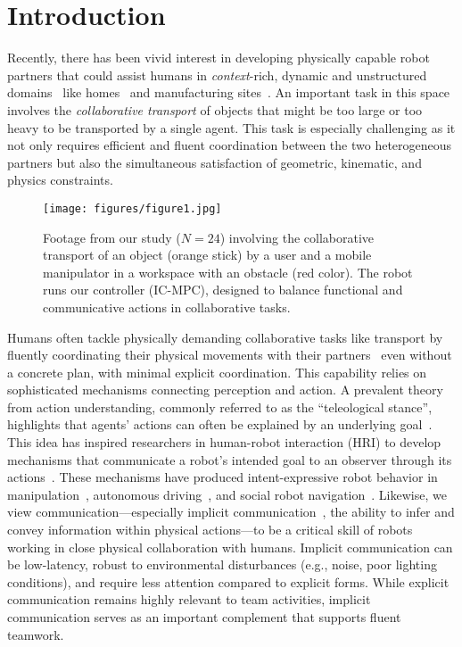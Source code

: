 \section{Introduction}\label{sec:introduction}

Recently, there has been vivid interest in developing physically capable robot partners that could assist humans in \emph{context}-rich, dynamic and unstructured domains~\citep{selvaggio2021survey} like homes~\citep{homerobotovmmchallenge2023, van2011robocup} and manufacturing sites~\citep{matheson2019human}. An important task in this space involves the \emph{collaborative transport} of objects that might be too large or too heavy to be transported by a single agent. This task is especially challenging as it not only requires efficient and fluent coordination between the two heterogeneous partners but also the simultaneous satisfaction of geometric, kinematic, and physics constraints.

\begin{figure}[t]
  \texttt{[image: figures/figure1.jpg]}
  \caption{Footage from our study ($N=24$) involving the collaborative transport of an object (orange stick) by a user and a mobile manipulator in a workspace with an obstacle (red color). The robot runs our controller (IC-MPC), designed to balance functional and communicative actions in collaborative tasks.}
  \label{fig:teaser}
\end{figure}

Humans often tackle physically demanding collaborative tasks like transport by fluently coordinating their physical movements with their partners~\citep{sebanz2006joint} even without a concrete plan, with minimal explicit coordination. This capability relies on sophisticated mechanisms connecting perception and action. A prevalent theory from action understanding, commonly referred to as the ``teleological stance'', highlights that agents' actions can often be explained by an underlying goal~\citep{csibra2007obsessed,gergely1995intentional,baker2009understanding}. This idea has inspired researchers in human-robot interaction (HRI) to develop mechanisms that communicate a robot's intended goal to an observer through its actions~\citep{DraganAuR14,knepper2017implicit}. These mechanisms have produced intent-expressive robot behavior in manipulation~\citep{DraganAuR14}, autonomous driving~\citep{sadigh2016cars}, and social robot navigation~\citep{mavrogiannis2022socialmomentum}.
Likewise, we view communication---especially implicit communication~\citep{knepper2017implicit}, the ability to infer and convey information within physical actions---to be a critical skill of robots working in close physical collaboration with humans. Implicit communication can be low-latency, robust to environmental disturbances (e.g., noise, poor lighting conditions), and require less attention compared to explicit forms. While explicit communication remains highly relevant to team activities, implicit communication serves as an important complement that supports fluent teamwork.

